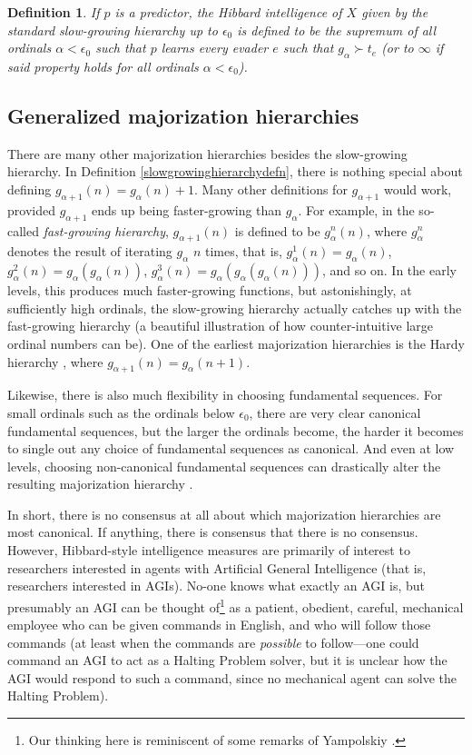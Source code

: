 \documentclass{article}
\newtheorem{definition}[theorem]{Definition}
\begin{document}
\begin{definition}
\label{tradmajorizationhierarchyhibbardmeasuredefn}
    If $p$ is a predictor, the \emph{Hibbard intelligence of $X$ given by the
    standard slow-growing hierarchy up to $\epsilon_0$} is defined to be the
    supremum of all ordinals $\alpha<\epsilon_0$ such that
    $p$ learns every evader $e$ such that $g_\alpha\succ t_e$ (or to
    $\infty$ if said property holds for all ordinals $\alpha<\epsilon_0$).
\end{definition}

\subsection{Generalized majorization hierarchies}

There are many other majorization hierarchies besides the slow-growing hierarchy.
In Definition \ref{slowgrowinghierarchydefn},
there is nothing special about defining $g_{\alpha+1}(n)=g_{\alpha}(n)+1$.
Many other definitions for $g_{\alpha+1}$ would work, provided $g_{\alpha+1}$ ends
up being faster-growing than $g_\alpha$.
For example, in the so-called \emph{fast-growing hierarchy},
$g_{\alpha+1}(n)$ is defined to be $g^n_\alpha(n)$, where $g^n_\alpha$
denotes the result of iterating $g_\alpha$ $n$ times, that is,
$g^1_\alpha(n)=g_\alpha(n)$, $g^2_\alpha(n)=g_\alpha(g_\alpha(n))$,
$g^3_\alpha(n)=g_\alpha(g_\alpha(g_\alpha(n)))$, and so on.
In the early levels, this produces much faster-growing functions,
but astonishingly, at sufficiently high ordinals, the slow-growing hierarchy
actually catches up with the fast-growing hierarchy \cite{girard1981pi12}
(a beautiful illustration of how counter-intuitive large ordinal numbers can be).
One of the earliest majorization hierarchies is the Hardy
hierarchy \cite{hardy1904theorem}, where $g_{\alpha+1}(n)=g_\alpha(n+1)$.

Likewise, there is also much flexibility in choosing fundamental sequences.
For small ordinals such as the ordinals below $\epsilon_0$, there are very clear
canonical fundamental sequences, but the larger the ordinals become, the harder
it becomes to single out any choice of fundamental sequences as canonical.
And even at low levels, choosing non-canonical fundamental sequences can
drastically alter the resulting majorization hierarchy \cite{weiermann1997sometimes}.

In short, there is no consensus at all about which majorization hierarchies are
most canonical. If anything, there is consensus that there is no consensus.
However, Hibbard-style intelligence measures are primarily of interest to researchers
interested in agents with Artificial General Intelligence (that is, researchers
interested in AGIs). No-one knows what exactly an AGI is, but presumably an AGI can
be thought of\footnote{Our thinking here is reminiscent of some remarks of
Yampolskiy \cite{yampolskiy2013turing}.} as a patient, obedient, careful,
mechanical employee who can
be given commands in English, and who will follow those commands (at least when
the commands are \emph{possible} to follow---one could command an AGI to act as a
Halting Problem solver, but it is unclear how the AGI would respond to such a command,
since no mechanical agent can solve the Halting Problem).
\end{document}
